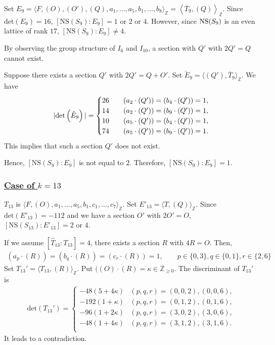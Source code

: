 \documentclass[10pt]{article}
\begin{document}
Set $E_9=\langle F,(O),(O'),(Q),a_1,\dots,a_5,b_1,\dots,b_8\rangle_\mathbb{Z} =\left\langle \overline{T}_9,(Q) \right\rangle_\mathbb{Z} $.
Since $\mathrm{det}(E_9)=16$,
$[\mathrm{NS}(S_9):E_9]=1 \text{ or } 2 \text{ or } 4.$
However, since ${{\rm NS} (S_9)} $ is an even lattice of rank $17$,
$[\mathrm{NS}(S_9):E_9]\not= 4.$



By observing the group structure of $I_6$ and $I_{10}$,
a section with  $Q'$ with $2Q'=Q$  cannot exist.

Suppose there exists a section $Q'$ with $2Q'=Q+O'$.
Set $\check{E}_9 = \langle (Q'), \overline{T}_9 \rangle_\mathbb{Z}$.
We have
\begin{align*}
|{\rm det} \left( \check{E}_9 \right)|
=
\begin{cases}
 26 \quad &( a_2 \cdot (Q')) = (b_4 \cdot (Q')) =1, \\
 14  \quad &( a_2 \cdot (Q')) = ( b_9  \cdot (Q')) =1,\\
 10 \quad &( a_5 \cdot (Q')) = ( b_4 \cdot (Q')) =1,\\
 74 \quad &( a_5 \cdot (Q')) = ( b_9 \cdot (Q')) =1.
\end{cases}
\end{align*}
This implies that such a section $Q'$ does not exist.


Hence, $[\mathrm{NS}(S_9):E_9]$ is not equal to $2$.
Therefore, $[\mathrm{NS}(S_9):E_9]=1$.







\subsubsection*{\underline{Case   of  $k=13$}}


$T_{13}$ is $\langle F,(O),a_1,\dots,a_5,b_1,c_1,\dots,c_7\rangle_\mathbb{Z} $.
Set $E'_{13}=\langle T,(Q) \rangle_\mathbb{Z}$.
Since
$\mathrm{det}(E'_{13})=-112$ and we have a section $O'$ with $2O'=O$,
$[\mathrm{NS}(S_{13}):E'_{13}]=2 \text{ or } 4$.


If we assume $\left[\widehat{T}_{13}:T_{13}\right]=4$,
there exists a section $R$ with $4R=O$.
Then,
\begin{align*}
(a_p\cdot(R) ) = (b_q\cdot(R)) = ( c_r\cdot(R))=1,\quad\quad
 p\in\{0,3\},q\in\{0,1\},r\in\{2,6\}
\end{align*}
Set
$T_{13}'=\langle T_{13},(R)\rangle_\mathbb{Z} $.
Put $((O)\cdot (R) =\kappa \in \mathbb{Z}_{\geq 0}$.
The discriminant of $T_{13}'$ is
\begin{align*}
\mathrm{det}(T_{13}')=
\begin{cases}
-48(5+4\kappa) & (p,q,r)=(0,0,2),(0,0,6),\\
-192(1+\kappa) & (p,q,r)=(0,1,2),(0,1,6),\\ 
-96(1+2\kappa) & (p,q,r)=(3,0,2),(3,0,6),\\
-48(1+4\kappa) & (p,q,r)=(3,1,2),(3,1,6).\\
\end{cases}
\end{align*}
It leads to a contradiction.
\end{document}
